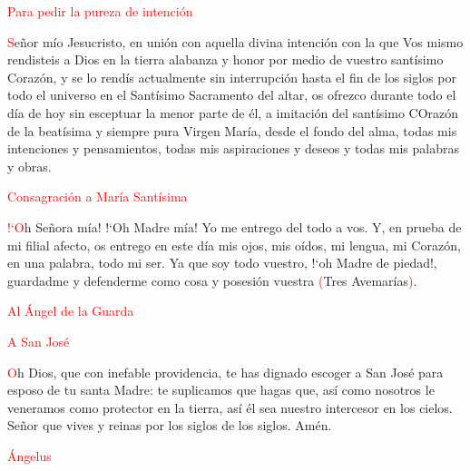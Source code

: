 \documentclass[9pt]{article}
\begin{document}
\begin{multicols}{2}
      \vspace{1mm}

      \textcolor{red}{Para pedir la pureza de intención}

      \textcolor{red}{S}eñor mío Jesucristo, en unión con aquella divina intención con la que Vos mismo rendisteis a Dios en la tierra alabanza y honor por medio de vuestro santísimo Corazón, y se lo rendís
      actualmente sin interrupción hasta el fin de los siglos por todo el universo en el Santísimo Sacramento del altar, os ofrezco durante todo el día de hoy sin esceptuar la menor parte de él,
      a imitación del santísimo COrazón de la beatísima y siempre pura Virgen María, desde el fondo del alma, todas mis intenciones y pensamientos, todas mis aspiraciones y deseos y todas mis
      palabras y obras.

      \vspace{1mm}

      \textcolor{red}{Consagración a María Santísima}

      \textcolor{red}{{!`}O}h Señora mía! {!`}Oh Madre mía! Yo me entrego del todo a vos. Y, en prueba de mi filial afecto, os entrego en este día mis ojos, mis oídos, mi lengua, mi Corazón,
      en una palabra, todo mi ser. Ya que soy todo vuestro, {!`}oh Madre de piedad!, guardadme y defenderme como cosa y posesión vuestra \textcolor{red}{(}Tres Avemarías\textcolor{red}{)}.

      \vspace{1mm}

      \textcolor{red}{Al Ángel de la Guarda}

      

      \vspace{1mm}

      \textcolor{red}{A San José}

      \textcolor{red}{O}h Dios, que con inefable providencia, te has dignado escoger a San José  para esposo de tu santa Madre: te suplicamos que hagas que, así como nosotros le veneramos
      como protector en la tierra, así él sea nuestro intercesor en los cielos. Señor que vives y reinas por los siglos de los siglos. Amén.

      \vspace{1mm}

      \textcolor{red}{Ángelus}

      

      

\end{multicols}
\end{document}
